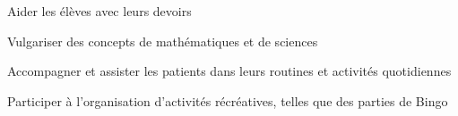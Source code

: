 \documentclass[letterpaper,10pt]{article}
\begin{document}
  \begin{resume_list}
    \item Aider les élèves avec leurs devoirs
    \item Vulgariser des concepts de mathématiques et de sciences
  \end{resume_list}
  
  \begin{resume_list}
    \item Accompagner et assister les patients dans leurs routines et activités quotidiennes
    \item Participer à l'organisation d'activités récréatives, telles que des parties de Bingo
  \end{resume_list}
\end{document}
